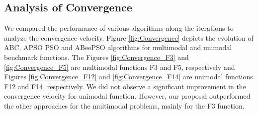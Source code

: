 \subsection{Analysis of Convergence}
We compared the performance of various algorithms along the iterations to analyze the convergence velocity. Figure \ref{fig:Convergence} depicts the evolution of ABC, APSO PSO and ABeePSO algorithms for multimodal and unimodal benchmark functions. The Figures \ref{fig:Convergence_F3} and \ref{fig:Convergence_F5} are multimodal functions F3 and F5, respectively and Figures \ref{fig:Convergence_F12} and \ref{fig:Convergence_F14} are unimodal functions F12 and F14, respectively. We did not observe a significant improvement in the convergence velocity for unimodal function. However, our proposal outperformed the other approaches for the multimodal problems, mainly for the F3 function.

